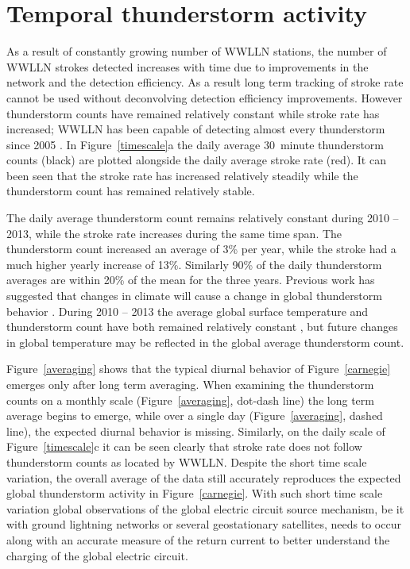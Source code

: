 \section{Temporal thunderstorm activity}

As a result of constantly growing number of WWLLN stations, the number of WWLLN strokes detected increases with time due to improvements in the network and the detection efficiency.
As a result long term tracking of stroke rate  cannot be used without deconvolving detection efficiency improvements.
However thunderstorm counts have remained relatively constant while stroke rate has increased; WWLLN has been capable of detecting almost every thunderstorm since 2005 \citep{Jacobson2006c}.
In Figure~\ref{timescale}a the daily average 30~minute thunderstorm counts (black) are plotted alongside the daily average stroke rate (red).
It can been seen that the stroke rate has increased relatively steadily while the thunderstorm count has remained relatively stable.

The daily average thunderstorm count remains relatively constant during 2010 -- 2013, while the stroke rate increases during the same time span.
The thunderstorm count increased an average of 3\% per year, while the stroke had a much higher yearly increase of 13\%.
Similarly 90\% of the daily thunderstorm averages are within 20\% of the mean for the three years.
Previous work has suggested that changes in climate will cause a change in global thunderstorm behavior \citep{Williams2005a, Price2009a}.
During 2010 -- 2013 the average global surface temperature and thunderstorm count have both remained relatively constant \citep{Hansen2013a}, but future changes in global temperature may be reflected in the global average thunderstorm count.

Figure~\ref{averaging} shows that the typical diurnal behavior of Figure~\ref{carnegie} emerges only after long term averaging.
When examining the thunderstorm counts on a monthly scale (Figure~\ref{averaging}, dot-dash line) the long term average begins to emerge, while over a single day (Figure~\ref{averaging}, dashed line), the expected diurnal behavior is missing.
Similarly, on the daily scale of Figure~\ref{timescale}c it can be seen clearly that stroke rate does not follow thunderstorm counts as located by WWLLN.
Despite the short time scale variation, the overall average of the data still accurately reproduces the expected global thunderstorm activity in Figure~\ref{carnegie}.
With such short time scale variation global observations of the global electric circuit source mechanism, be it with ground lightning networks or several geostationary satellites, needs to occur along with an accurate measure of the return current to better understand the charging of the global electric circuit.

